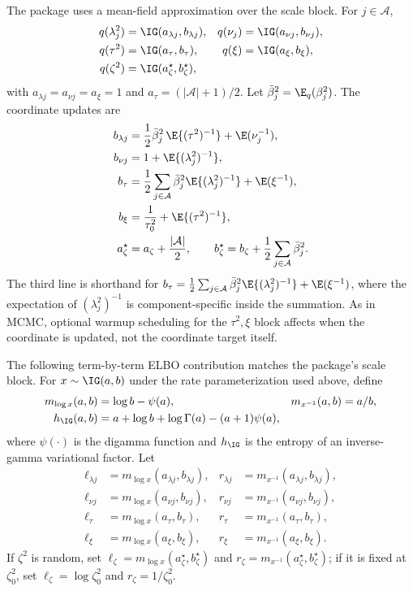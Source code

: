 The package uses a mean-field approximation over the  scale block. For
$j\in\mathcal{A}$,
\begin{align}
q(\lambda_j^2)&=\IG(a_{\lambda j},b_{\lambda j}),&
q(\nu_j)&=\IG(a_{\nu j},b_{\nu j}),\\
q(\tau^2)&=\IG(a_\tau,b_\tau),&
q(\xi)&=\IG(a_\xi,b_\xi),\\
q(\zeta^2)&=\IG(a_\zeta^\star,b_\zeta^\star),
\end{align}
with $a_{\lambda j}=a_{\nu j}=a_\xi=1$ and
$a_\tau=(|\mathcal{A}|+1)/2$. Let
$\bar\beta_j^2=\E_q(\beta_j^2)$. The coordinate updates are
\begin{align}
b_{\lambda j}
&=\frac{1}{2}\bar\beta_j^2\,\E\{(\tau^2)^{-1}\}+\E(\nu_j^{-1}),\\
b_{\nu j}
&=1+\E\{(\lambda_j^2)^{-1}\},\\
b_\tau
&=\frac{1}{2}\sum_{j\in\mathcal{A}}\bar\beta_j^2
\E\{(\lambda_j^2)^{-1}\}+\E(\xi^{-1}),\\
b_\xi
&=\frac{1}{\tau_0^2}+\E\{(\tau^2)^{-1}\},\\
a_\zeta^\star
&=a_\zeta+\frac{|\mathcal{A}|}{2},\qquad
b_\zeta^\star=b_\zeta+\frac{1}{2}\sum_{j\in\mathcal{A}}\bar\beta_j^2.
\label{eq:rhs_ns_vb_updates}
\end{align}
The third line is shorthand for
$b_\tau=\frac{1}{2}\sum_{j\in\mathcal{A}}\bar\beta_j^2
\E\{(\lambda_j^2)^{-1}\}+\E(\xi^{-1})$, where the expectation of
$(\lambda_j^2)^{-1}$ is component-specific inside the summation.
As in MCMC, optional warmup scheduling for the $\tau^2,\xi$ block affects when
the coordinate is updated, not the coordinate target itself.

The following term-by-term ELBO contribution matches the package's
 scale block. For $x\sim\IG(a,b)$ under the rate
parameterization used above, define
\begin{align}
m_{\log x}(a,b)&=\log b-\psi(a),&
m_{x^{-1}}(a,b)&=a/b,\\
h_{\IG}(a,b)&=a+\log b+\log\Gamma(a)-(a+1)\psi(a),
\end{align}
where $\psi(\cdot)$ is the digamma function and $h_{\IG}$ is the entropy of an
inverse-gamma variational factor. Let
\begin{align}
\ell_{\lambda j}&=m_{\log x}(a_{\lambda j},b_{\lambda j}),&
r_{\lambda j}&=m_{x^{-1}}(a_{\lambda j},b_{\lambda j}),\\
\ell_{\nu j}&=m_{\log x}(a_{\nu j},b_{\nu j}),&
r_{\nu j}&=m_{x^{-1}}(a_{\nu j},b_{\nu j}),\\
\ell_\tau&=m_{\log x}(a_\tau,b_\tau),&
r_\tau&=m_{x^{-1}}(a_\tau,b_\tau),\\
\ell_\xi&=m_{\log x}(a_\xi,b_\xi),&
r_\xi&=m_{x^{-1}}(a_\xi,b_\xi).
\end{align}
If $\zeta^2$ is random, set
$\ell_\zeta=m_{\log x}(a_\zeta^\star,b_\zeta^\star)$ and
$r_\zeta=m_{x^{-1}}(a_\zeta^\star,b_\zeta^\star)$; if it is fixed at
$\zeta_0^2$, set $\ell_\zeta=\log\zeta_0^2$ and
$r_\zeta=1/\zeta_0^2$.

